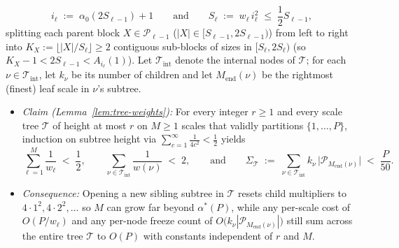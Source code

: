 \documentclass[11pt]{article}
\theoremstyle{definition}
\theoremstyle{remark}
\begin{document}
\[
i_\ell \;:=\; \alpha_0(2 S_{\ell-1}) + 1
\qquad\text{and}\qquad
S_\ell \;:=\; w_\ell\,i_\ell^2 \;\le\; \frac{1}{2} S_{\ell-1},
\]
splitting each parent block $X \in \mathcal{P}_{\ell-1}$ ($|X| \in [S_{\ell-1}, 2 S_{\ell-1})$) from left to right into $K_X := \lfloor |X| / S_\ell \rfloor \ge 2$ contiguous sub-blocks of sizes in $[S_\ell, 2 S_\ell)$ (so $K_X - 1 < 2 S_{\ell-1} < A_{i_\ell}(1)$). Let $\mathcal{T}_{\mathrm{int}}$ denote the internal nodes of $\mathcal{T}$; for each $\nu \in \mathcal{T}_{\mathrm{int}}$, let $k_\nu$ be its number of children and let $M_{\mathrm{end}}(\nu)$ be the rightmost (finest) leaf scale in $\nu$'s subtree.
\begin{itemize}[leftmargin=2em, itemsep=2pt]
  \item \emph{Claim (Lemma~\ref{lem:tree-weights}):} For every integer $r \ge 1$ and every scale tree $\mathcal{T}$ of height at most $r$ on $M \ge 1$ scales that validly partitions $\{1, \dots, P\}$, induction on subtree height via $\sum_{c=1}^\infty \frac{1}{4 c^2} < \frac{1}{2}$ yields
  \[
  \sum_{\ell=1}^M \frac{1}{w_\ell} \;<\; \frac{1}{2},
  \qquad
  \sum_{\nu \in \mathcal{T}_{\mathrm{int}}} \frac{1}{w(\nu)} \;<\; 2,
  \qquad\text{and}\qquad
  \Sigma_{\mathcal{T}} \;:=\; \sum_{\nu \in \mathcal{T}_{\mathrm{int}}} k_\nu\,\big|\mathcal{P}_{M_{\mathrm{end}}(\nu)}\big| \;<\; \frac{P}{50}.
  \]
  \item \emph{Consequence:} Opening a new sibling subtree in $\mathcal{T}$ resets child multipliers to $4 \cdot 1^2, 4 \cdot 2^2, \dots$ so $M$ can grow far beyond $\alpha^*(P)$, while any per-scale cost of $O(P / w_\ell)$ and any per-node freeze count of $O\big(k_\nu |\mathcal{P}_{M_{\mathrm{end}}(\nu)}|\big)$ still sum across the entire tree $\mathcal{T}$ to $O(P)$ with constants independent of $r$ and $M$.
\end{itemize}
\end{document}
